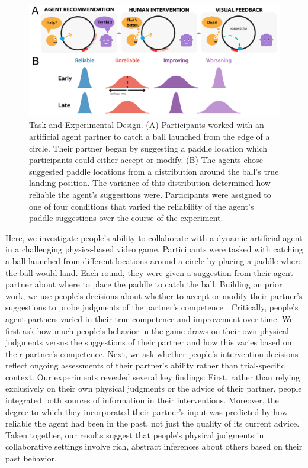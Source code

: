 \documentclass[10pt,letterpaper]{article}
\begin{document}
\begin{figure}[hbtp]
\vspace{-8mm}
\includegraphics[width=\textwidth]{img/expt_overview.pdf} 
\vspace{-4mm}
\caption{Task and Experimental Design. (A) Participants worked with an artificial agent partner to catch a ball launched from the edge of a circle. Their partner began by suggesting a paddle location which participants could either accept or modify. (B) The agents chose suggested paddle locations from a distribution around the ball's true landing position. The variance of this distribution determined how reliable the agent's suggestions were. Participants were assigned to one of four conditions that varied the reliability of the agent's paddle suggestions over the course of the experiment.} 
\label{fig:stimuli}
\end{figure}


\newpage

Here, we investigate people's ability to collaborate with a dynamic artificial agent in a challenging physics-based video game. Participants were tasked with catching a ball launched from different locations around a circle by placing a paddle where the ball would land. Each round, they were given a suggestion from their agent partner about where to place the paddle to catch the ball. Building on prior work, we use people's decisions about whether to accept or modify their partner's suggestions to probe judgments of the partner's competence \cite{xie2019robot, chen2020trust}. Critically, people's agent partners varied in their true competence and improvement over time. We first ask how much people's behavior in the game draws on their own physical judgments versus the suggestions of their partner and how this varies based on their partner's competence. Next, we ask whether people's intervention decisions reflect ongoing assessments of their partner's ability rather than trial-specific context. 
Our experiments revealed several key findings: First, rather than relying exclusively on their own physical judgments or the advice of their partner, people integrated both sources of information in their interventions. Moreover, the degree to which they incorporated their partner's input was predicted by how reliable the agent had been in the past, not just the quality of its current advice. Taken together, our results suggest that people's physical judgments in collaborative settings involve rich, abstract inferences about others based on their past behavior.
 
\end{document}
